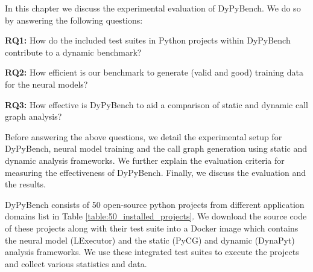 In this chapter we discuss the experimental evaluation of DyPyBench. We do so by answering the following questions:

\textbf{RQ1:} How do the included test suites in Python projects within DyPyBench contribute to a dynamic benchmark?

\textbf{RQ2:} How efficient is our benchmark to generate (valid and good) training data for the neural models?

\textbf{RQ3:} How effective is DyPyBench to aid a comparison of static and dynamic call graph analysis?

Before answering the above questions, we detail the experimental setup for DyPyBench, neural model training and the call graph generation using static and dynamic analysis frameworks.
We further explain the evaluation criteria for measuring the effectiveness of DyPyBench.
Finally, we discuss the evaluation and the results.

DyPyBench consists of 50 open-source python projects from different application domains list in Table \ref{table:50_installed_projects}.
We download the source code of these projects along with their test suite into a Docker image which contains the neural model (LExecutor) and the static (PyCG) and dynamic (DynaPyt) analysis frameworks.
We use these integrated test suites to execute the projects and collect various statistics and data.


